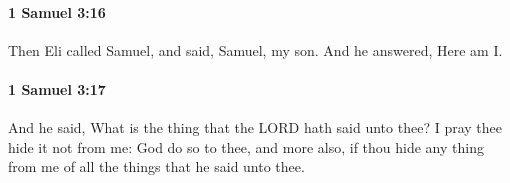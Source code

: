 		\paragraph{1 Samuel 3:16} %
			\label{1SAMUEL-3-16}

			Then Eli called Samuel, and said, Samuel, my son. And he answered, Here am I.


		\paragraph{1 Samuel 3:17} %
			\label{1SAMUEL-3-17}

			And he said, What is the thing that the LORD hath said unto thee? I pray thee hide it not from me: God do so to thee, and more also, if thou hide any thing from me of all the things that he said unto thee.


